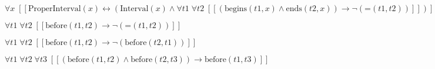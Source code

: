 \documentclass{article}
\begin{document}
$\forall x\;  \left[ \left[ \textrm{ProperInterval}(x) \leftrightarrow \left(\textrm{Interval}(x) \land \forall t1\; \forall t2\;  \left[ \left[ \left(\textrm{begins}(t1,x) \land \textrm{ends}(t2,x)\right) \rightarrow \neg \left(\textrm{=}(t1,t2)\right) \right] \right]\right) \right] \right]$

$\forall t1\; \forall t2\;  \left[ \left[ \textrm{before}(t1,t2) \rightarrow \neg \left(\textrm{=}(t1,t2)\right) \right] \right]$

$\forall t1\; \forall t2\;  \left[ \left[ \textrm{before}(t1,t2) \rightarrow \neg \left(\textrm{before}(t2,t1)\right) \right] \right]$

$\forall t1\; \forall t2\; \forall t3\;  \left[ \left[ \left(\textrm{before}(t1,t2) \land \textrm{before}(t2,t3)\right) \rightarrow \textrm{before}(t1,t3) \right] \right]$
\end{document}
